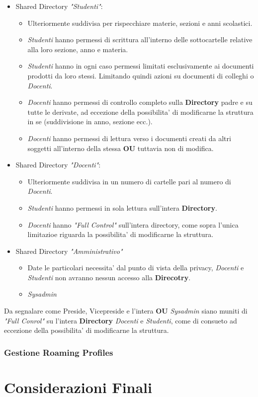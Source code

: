 \documentclass{report}
\begin{document}
            \begin{itemize}
            \item Shared Directory \textit{"Studenti"}:
                \begin{itemize}
                    \item Ulteriormente suddivisa per rispecchiare materie, sezioni e anni scolastici.
                    \item \emph{Studenti} hanno permessi di scrittura all'interno delle sottocartelle relative
                        alla loro sezione, anno e materia.
                    \item \emph{Studenti} hanno in ogni caso permessi limitati esclusivamente ai documenti
                        prodotti da loro stessi. Limitando quindi azioni su documenti di colleghi o \emph{Docenti}.
                    \item \emph{Docenti} hanno permessi di controllo completo sulla \textbf{Directory} padre
                        e su tutte le derivate, ad eccezione della possibilita' di modificarne la struttura in se
                        (suddivisione in anno, sezione ecc.).
                    \item \emph{Docenti} hanno permessi di lettura verso i documenti creati da altri soggetti
                        all'interno della stessa \textbf{OU} tuttavia non di modifica.
                \end{itemize}
            \item Shared Directory \textit{"Docenti"}:
                \begin{itemize}
                    \item Ulteriormente suddivisa in un numero di cartelle pari al numero di \emph{Docenti}.
                    \item \emph{Studenti} hanno permessi in sola lettura sull'intera \textbf{Directory}.
                    \item \emph{Docenti} hanno \emph{"Full Control"} sull'intera directory, come sopra 
                        l'unica limitazioe riguarda la possibilita' di modificarne la struttura.
                \end{itemize}
            \item Shared Directory \textit{"Amministrativo"}
                \begin{itemize}
                    \item Date le particolari necessita' dal punto di vista della privacy, \emph{Docenti} e
                     \emph{Studenti} non avranno nessun accesso alla \textbf{Direcotry}.
                    \item \emph{Sysadmin} 
                \end{itemize}
            \end{itemize}
            Da segnalare come Preside, Vicepreside e l'intera \textbf{OU} \emph{Sysadmin} siano muniti di
             \emph{"Full Conrol"} su l'intera \textbf{Directory} \emph{Docenti} e \emph{Studenti}, come di
             consueto ad eccezione della possibilita' di modificarne la struttura.
            \subsection{Gestione Roaming Profiles}
    \chapter{Considerazioni Finali}
            
\end{document}
